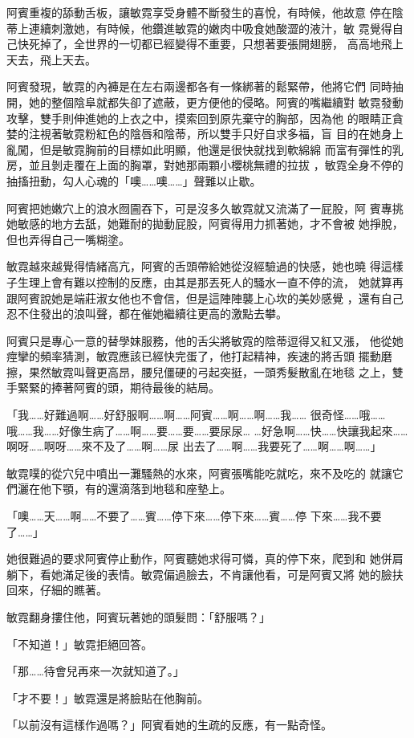 阿賓重複的舔動舌板，讓敏霓享受身體不斷發生的喜悅，有時候，他故意
停在陰蒂上連續刺激她，有時候，他鑽進敏霓的嫩肉中吸食她酸澀的液汁，敏
霓覺得自己快死掉了，全世界的一切都已經變得不重要，只想著要張開翅膀，
高高地飛上天去，飛上天去。

阿賓發現，敏霓的內褲是在左右兩邊都各有一條綁著的鬆緊帶，他將它們
同時抽開，她的整個陰阜就都失卻了遮蔽，更方便他的侵略。阿賓的嘴繼續對
敏霓發動攻擊，雙手則伸進她的上衣之中，摸索回到原先棄守的胸部，因為他
的眼睛正貪婪的注視著敏霓粉紅色的陰唇和陰蒂，所以雙手只好自求多福，盲
目的在她身上亂闖，但是敏霓胸前的目標如此明顯，他還是很快就找到軟綿綿
而富有彈性的乳房，並且剝走覆在上面的胸罩，對她那兩顆小櫻桃無禮的拉拔
，敏霓全身不停的抽搐扭動，勾人心魂的「噢……噢……」聲難以止歇。

阿賓把她嫩穴上的浪水囫圇吞下，可是沒多久敏霓就又流滿了一屁股，阿
賓專挑她敏感的地方去舐，她難耐的拋動屁股，阿賓得用力抓著她，才不會被
她掙脫，但也弄得自己一嘴糊塗。

敏霓越來越覺得情緒高亢，阿賓的舌頭帶給她從沒經驗過的快感，她也曉
得這樣子生理上會有難以控制的反應，由其是那丟死人的騷水一直不停的流，
她就算再跟阿賓說她是端莊淑女他也不會信，但是這陣陣襲上心坎的美妙感覺
，還有自己忍不住發出的浪叫聲，都在催她繼續往更高的激點去攀。

阿賓只是專心一意的替學妹服務，他的舌尖將敏霓的陰蒂逗得又紅又漲，
他從她痙攣的頻率猜測，敏霓應該已經快完蛋了，他打起精神，疾速的將舌頭
擺動磨擦，果然敏霓叫聲更高昂，腰兒僵硬的弓起突挺，一頭秀髮散亂在地毯
之上，雙手緊緊的捧著阿賓的頭，期待最後的結局。

「我……好難過啊……好舒服啊……啊……阿賓……啊……啊……我……
很奇怪……哦……哦……我……好像生病了……啊……要……要……要尿尿…
…好急啊……快……快讓我起來……啊呀……啊呀……來不及了……啊……尿
出去了……啊……我要死了……啊……啊……」

敏霓噗的從穴兒中噴出一灘騷熱的水來，阿賓張嘴能吃就吃，來不及吃的
就讓它們灑在他下顎，有的還滴落到地毯和座墊上。

「噢……天……啊……不要了……賓……停下來……停下來……賓……停
下來……我不要了……」

她很難過的要求阿賓停止動作，阿賓聽她求得可憐，真的停下來，爬到和
她併肩躺下，看她滿足後的表情。敏霓偏過臉去，不肯讓他看，可是阿賓又將
她的臉扶回來，仔細的瞧著。

敏霓翻身摟住他，阿賓玩著她的頭髮問：「舒服嗎？」

「不知道！」敏霓拒絕回答。

「那……待會兒再來一次就知道了。」

「才不要！」敏霓還是將臉貼在他胸前。

「以前沒有這樣作過嗎？」阿賓看她的生疏的反應，有一點奇怪。

